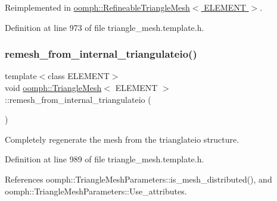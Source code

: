 Reimplemented in \hyperlink{classoomph_1_1RefineableTriangleMesh_a3ecdb3b15c3fefbc96f407c4fdf5b155}{oomph\+::\+Refineable\+Triangle\+Mesh$<$ E\+L\+E\+M\+E\+N\+T $>$}.



Definition at line 973 of file triangle\+\_\+mesh.\+template.\+h.

\mbox{\label{classoomph_1_1TriangleMesh_a9bc95b0f26f8cd352997d2db32a6a292}} 
\subsubsection{\texorpdfstring{remesh\+\_\+from\+\_\+internal\+\_\+triangulateio()}{remesh\_from\_internal\_triangulateio()}}
{\footnotesize\ttfamily template$<$class E\+L\+E\+M\+E\+NT$>$ \\
void \hyperlink{classoomph_1_1TriangleMesh}{oomph\+::\+Triangle\+Mesh}$<$ E\+L\+E\+M\+E\+NT $>$\+::remesh\+\_\+from\+\_\+internal\+\_\+triangulateio (\begin{DoxyParamCaption}{ }\end{DoxyParamCaption})\hspace{0.3cm}{\ttfamily [inline]}}



Completely regenerate the mesh from the trianglateio structure. 



Definition at line 989 of file triangle\+\_\+mesh.\+template.\+h.



References oomph\+::\+Triangle\+Mesh\+Parameters\+::is\+\_\+mesh\+\_\+distributed(), and oomph\+::\+Triangle\+Mesh\+Parameters\+::\+Use\+\_\+attributes.

\mbox{\label{classoomph_1_1TriangleMesh_a2ae8220e71309b0fb2b53194c6383f95}} 
